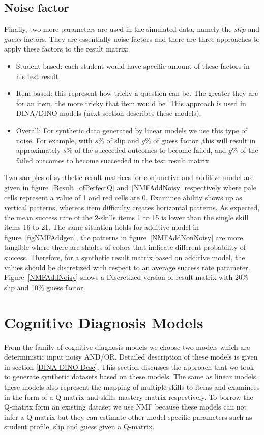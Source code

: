 \subsection{Noise factor}
\label{Noise_}
Finally, two more parameters are used in the simulated data, namely the $\mathit{slip}$ and $\mathit{guess}$ factors. They are essentially noise factors and there are three approaches to apply these factors to the result matrix:
\begin{itemize}
\item Student based: each student would have specific amount of these factors in his test result.
\item Item based: this represent how tricky a question can be. The greater they are for an item, the more tricky that item would be. This approach is used in DINA/DINO models (next section describes these models).
\item Overall: For synthetic data generated by linear models we use this type of noise. For example, with $s\%$ of slip and $g\%$ of guess factor ,this will result in approximately $s\%$ of the succeeded outcomes to become failed, and $g\%$ of the failed outcomes to become succeeded in the test result matrix.

\end{itemize}

Two samples of synthetic result matrices for conjunctive and additive model are given in figure~\ref{Result_ofPerfectQ} and~\ref{NMFAddNoisy} respectively where pale cells represent a value of 1 and red cells are 0. Examinee ability shows up as vertical patterns, whereas item difficulty creates horizontal patterns. As expected, the mean success rate of the 2-skills items 1 to 15 is lower than the single skill items 16 to 21. The same situation holds for additive model in figure~\ref{figNMFAddgen}, the patterns in figure~\ref{NMFAddNonNoisy} are more tangible where there are shades of colors that indicate different probability of success. Therefore, for a synthetic result matrix based on additive model, the values should be discretized with respect to an average success rate parameter. Figure~\ref{NMFAddNoisy} shows a Discretized version of result matrix with 20\% slip and 10\% guess factor.


\section{Cognitive Diagnosis Models}

From the family of cognitive diagnosis models we choose two models which are deterministic input noisy AND/OR. Detailed description of these models is given in section \ref{DINA-DINO-Desc}. This section discusses the approach that we took to generate synthetic datasets based on these models. The same as linear models, these models also represent the mapping of multiple skills to items and examinees in the form of a Q-matrix and skills mastery matrix respectively. To borrow the Q-matrix form an existing dataset we use NMF because these models can not infer a Q-matrix but they can estimate other model specific parameters such as student profile, slip and guess given a Q-matrix. 

